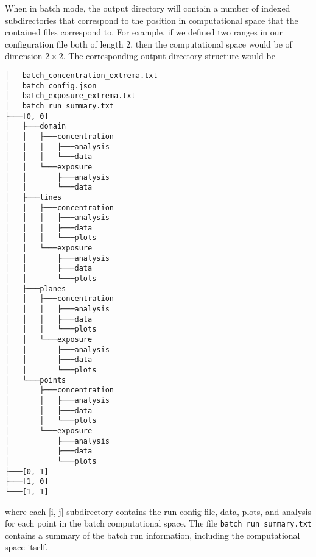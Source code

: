 \documentclass[]{article}
\def\code#1{\texttt{#1}}
\begin{document}
\noindent When in batch mode, the output directory will contain a number of indexed
subdirectories that correspond to the position in computational space that the
contained files correspond to. For example, if we defined two ranges in our
configuration file both of length $2$, then the computational space would be of
dimension $2\times2$. The corresponding output directory structure would be
\begin{verbatim}
│   batch_concentration_extrema.txt
│   batch_config.json
│   batch_exposure_extrema.txt
│   batch_run_summary.txt
├───[0, 0]
│   ├───domain
│   │   ├───concentration
│   │   │   ├───analysis
│   │   │   └───data
│   │   └───exposure
│   │       ├───analysis
│   │       └───data
│   ├───lines
│   │   ├───concentration
│   │   │   ├───analysis
│   │   │   ├───data
│   │   │   └───plots
│   │   └───exposure
│   │       ├───analysis
│   │       ├───data
│   │       └───plots
│   ├───planes
│   │   ├───concentration
│   │   │   ├───analysis
│   │   │   ├───data
│   │   │   └───plots
│   │   └───exposure
│   │       ├───analysis
│   │       ├───data
│   │       └───plots
│   └───points
│       ├───concentration
│       │   ├───analysis
│       │   ├───data
│       │   └───plots
│       └───exposure
│           ├───analysis
│           ├───data
│           └───plots
├───[0, 1]
├───[1, 0]
└───[1, 1]
\end{verbatim}
where each [i, j] subdirectory contains the run config file, data, plots, and
analysis for each point in the batch computational space. The file
\code{batch\_run\_summary.txt} contains a summary of the batch run information,
including the computational space itself.
\end{document}
